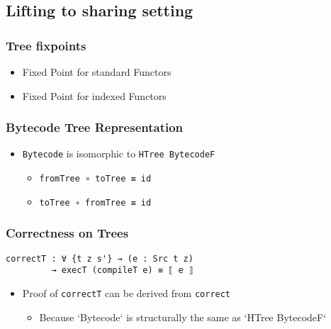     \subsection{Lifting to sharing setting}

        \begin{frame}[fragile]
            \frametitle{Tree fixpoints}

            \begin{itemize}
                \item Fixed Point for standard Functors
            
                \item Fixed Point for indexed Functors
            \end{itemize}
\end{frame}

        \begin{frame}[fragile]
            \frametitle{Bytecode Tree Representation}


            \begin{itemize} 
                \item \texttt{Bytecode} is isomorphic to \texttt{HTree BytecodeF}
                    \begin{itemize}
                        \item \texttt{fromTree ∘ toTree ≡ id}
                        \item \texttt{toTree ∘ fromTree ≡ id}
                    \end{itemize}
            \end{itemize}
\end{frame}
                
        \begin{frame}[fragile]
            \frametitle{Correctness on Trees}


            \begin{verbatim}
correctT : ∀ {t z s'} → (e : Src t z) 
         → execT (compileT e) ≡ ⟦ e ⟧
            \end{verbatim}

            \begin{itemize}
                \item Proof of \texttt{correctT} can be derived from \texttt{correct}
                    \begin{itemize}
                        \item Because `Bytecode` is structurally the same as `HTree BytecodeF`
                    \end{itemize}
            \end{itemize}
\end{frame}

